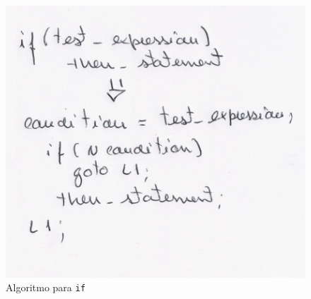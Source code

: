 \begin{figure}[htpb]
	\centering
	\includegraphics[scale=0.75]{./report/img/if.png}
	\caption{Algoritmo para \texttt{if}}
\label{fig:figure1}
\end{figure}
